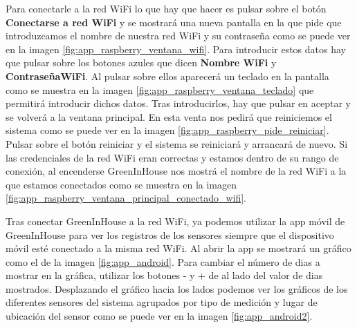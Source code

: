 Para conectarle a la red WiFi lo que hay que hacer es pulsar sobre el botón \textbf{Conectarse a red WiFi} y se mostrará una nueva pantalla en la que pide que introduzcamos el nombre de nuestra red WiFi y su contraseña como se puede ver en la imagen \ref{fig:app_raspberry_ventana_wifi}.
Para introducir estos datos hay que pulsar sobre los botones azules que dicen \textbf{Nombre WiFi} y \textbf{ContraseñaWiFi}. Al pulsar sobre ellos aparecerá un teclado en la pantalla como se muestra en la imagen \ref{fig:app_raspberry_ventana_teclado} que permitirá introducir dichos datos.
Tras introducirlos, hay que pulsar en aceptar y se volverá a la ventana principal. En esta venta nos pedirá que reiniciemos el sistema como se puede ver en la imagen \ref{fig:app_raspberry_pide_reiniciar}.
Pulsar sobre el botón reiniciar y el sistema se reiniciará y arrancará de nuevo. Si las credenciales de la red WiFi eran correctas y estamos dentro de su rango de conexión, al encenderse GreenInHouse nos mostrá el nombre de la red WiFi a la que estamos conectados como se muestra en la imagen \ref{fig:app_raspberry_ventana_principal_conectado_wifi}.

Tras conectar GreenInHouse a la red WiFi, ya podemos utilizar la app móvil de GreenInHouse para ver los registros de los sensores siempre que el dispositivo móvil esté conectado a la misma red WiFi. Al abrir la app se mostrará un gráfico como el de la imagen \ref{fig:app_android}.
Para cambiar el número de dias a mostrar en la gráfica, utilizar los botones - y + de al lado del valor de dias mostrados. Desplazando el gráfico hacia los lados podemos ver los gráficos de los diferentes sensores del sistema agrupados por tipo de medición y lugar de ubicación del sensor como se puede ver en la imagen \ref{fig:app_android2}.

